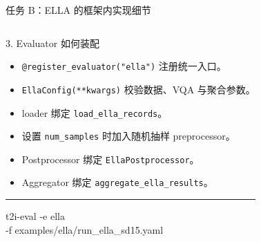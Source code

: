 \documentclass[aspectratio=169,10pt]{beamer}
\begin{document}
\begin{frame}{任务 B：ELLA 的框架内实现细节}
\begin{columns}[T,onlytextwidth]
      \begin{block}{3. Evaluator 如何装配}
        \begin{minipage}[c][5.05cm][c]{\linewidth}
          \begin{itemize}\scriptsize
            \item \texttt{@register\_evaluator("ella")} 注册统一入口。
            \item \texttt{EllaConfig(**kwargs)} 校验数据、VQA 与聚合参数。
            \item loader 绑定 \texttt{load\_ella\_records}。
            \item 设置 \texttt{num\_samples} 时加入随机抽样 preprocessor。
            \item Postprocessor 绑定 \texttt{EllaPostprocessor}。
            \item Aggregator 绑定 \texttt{aggregate\_ella\_results}。
          \end{itemize}
          \vspace{0.45em}
          \color{T2IGray}\rule{\linewidth}{0.35pt}\par\vspace{0.3em}
          \scriptsize\ttfamily
          t2i-eval -e ella\\
          -f examples/ella/run\_ella\_sd15.yaml
        \end{minipage}
      \end{block}
  \end{columns}
\end{frame}
\end{document}
